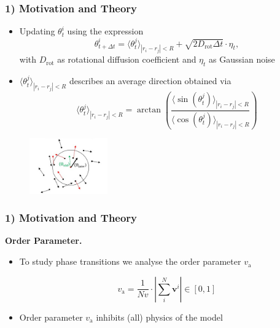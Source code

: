 \begin{frame}
	\frametitle{1) Motivation and Theory}
	\begin{itemize}
	    \item Updating $\theta_t^i$ using the expression
	    	\begin{equation}
	        	\theta_{t + \Delta t}^i = \langle \theta_t^j \rangle_{|r_i - r_j| < R} + \sqrt{2 D_\mathrm{rot} \Delta t} \cdot \eta_t,
	    	\end{equation} \noindent 
	    with $D_\mathrm{rot}$ as rotational diffusion coefficient and $\eta_t$ as Gaussian noise  
	    \item $\langle \theta_t^j \rangle_{|r_i - r_j| < R}$ describes an average direction obtained via    
	    	\begin{equation}
	        	\langle \theta_t^j \rangle_{|r_i - r_j| < R} = \arctan{\left(\frac{\langle \sin{(\theta_t^j)} \rangle_{|r_i - r_j| < R}}{\langle \cos{(\theta_t^j)} \rangle_{|r_i - r_j| < R}}\right)}
		    \end{equation}
	\end{itemize}
	\begin{figure}[H]
  		\includegraphics[width=0.3\textwidth]{images/chapter1/particle_direction.jpeg} 
	\end{figure}
\end{frame}

\begin{frame}
	\frametitle{1) Motivation and Theory}
	\textbf{Order Parameter.}
	\begin{itemize}
		\item To study phase transitions we analyse the order parameter $v_\mathrm{a}$
	
			\begin{equation}
	    		v_\mathrm{a} = \frac{1}{N v} \cdot \left| \sum_i^N \mathbf{v}^i \right| \in \left[0,1\right]
			\end{equation}
		\item Order parameter $v_\mathrm{a}$ inhibits (all) physics of the model
	\end{itemize}
\end{frame}